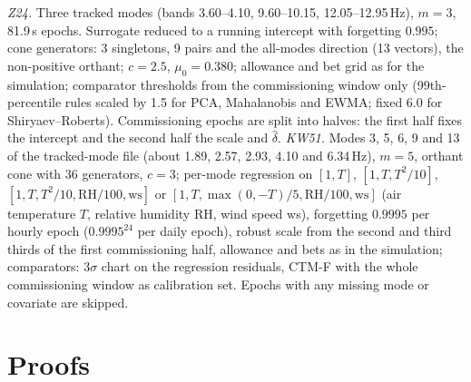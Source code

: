 \documentclass[12pt,a4paper]{article}
\newcommand{\rev}[1]{#1}
\newenvironment{revblock}{}{}
\newcommand{\rev}[1]{{\color{revcol}#1}}
\newenvironment{revblock}{\begingroup\color{revcol}}{\endgroup}
\begin{document}
\begin{revblock}
\begin{singlespace}
\smallskip
\noindent\emph{Z24.} Three tracked modes (bands 3.60--4.10, 9.60--10.15, 12.05--12.95\,Hz), $m=3$, 81.9\,s epochs. Surrogate reduced to a running intercept with forgetting $0.995$; cone generators: 3 singletons, 9 pairs and the all-modes direction (13 vectors), the non-positive orthant; $c=2.5$, $\mu_0=0.380$; allowance and bet grid as for the simulation; comparator thresholds from the commissioning window only (99th-percentile rules scaled by 1.5 for PCA, Mahalanobis and EWMA; fixed 6.0 for Shiryaev--Roberts). Commissioning epochs are split into halves: the first half fixes the intercept and the second half the scale and $\hat\delta$. \rev{\emph{KW51.} Modes 3, 5, 6, 9 and 13 of the tracked-mode file (about 1.89, 2.57, 2.93, 4.10 and 6.34\,Hz), $m=5$, orthant cone with 36 generators, $c=3$; per-mode regression on $[1,T]$, $[1,T,T^2/10]$, $[1,T,T^2/10,\mathrm{RH}/100,\mathrm{ws}]$ or $[1,T,\max(0,-T)/5,\mathrm{RH}/100,\mathrm{ws}]$ (air temperature $T$, relative humidity RH, wind speed ws), forgetting $0.9995$ per hourly epoch ($0.9995^{24}$ per daily epoch), robust scale from the second and third thirds of the first commissioning half, allowance and bets as in the simulation; comparators: $3\sigma$ chart on the regression residuals, CTM-F with the whole commissioning window as calibration set. Epochs with any missing mode or covariate are skipped.}
\end{singlespace}
\end{revblock}

\section{Proofs}\label{app:proofs}
\end{document}
